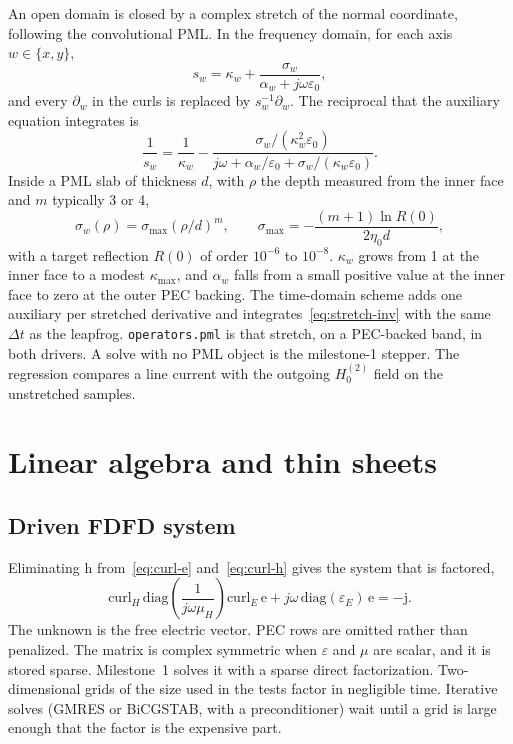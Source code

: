 \documentclass[11pt,a4paper]{article}
\numberwithin{equation}{section}
\begin{document}
An open domain is closed by a complex stretch of the normal coordinate,
following the convolutional PML. In the frequency domain, for each axis
$w\in\{x,y\}$,
\begin{equation}
s_w = \kappa_w + \frac{\sigma_w}{\alpha_w + j\omega\varepsilon_0},
\label{eq:stretch}
\end{equation}
and every $\partial_w$ in the curls is replaced by $s_w^{-1}\partial_w$. The
reciprocal that the auxiliary equation integrates is
\begin{equation}
\frac{1}{s_w}
=
\frac{1}{\kappa_w}
-
\frac{\sigma_w/(\kappa_w^2\varepsilon_0)}
{j\omega + \alpha_w/\varepsilon_0 + \sigma_w/(\kappa_w\varepsilon_0)}.
\label{eq:stretch-inv}
\end{equation}
Inside a PML slab of thickness $d$, with $\rho$ the depth measured from the
inner face and $m$ typically 3 or 4,
\begin{equation}
\sigma_w(\rho) = \sigma_{\max}(\rho/d)^m,
\qquad
\sigma_{\max} = -\frac{(m+1)\ln R(0)}{2\eta_0 d},
\label{eq:sigma-max}
\end{equation}
with a target reflection $R(0)$ of order $10^{-6}$ to $10^{-8}$. $\kappa_w$
grows from 1 at the inner face to a modest $\kappa_{\max}$, and $\alpha_w$
falls from a small positive value at the inner face to zero at the outer PEC
backing. The time-domain scheme adds one auxiliary per stretched derivative
and integrates~\eqref{eq:stretch-inv} with the same $\Delta t$ as the
leapfrog. \texttt{operators.pml} is that stretch, on a PEC-backed band, in
both drivers. A solve with no PML object is the milestone-1 stepper. The
regression compares a line current with the outgoing $H_0^{(2)}$ field on
the unstretched samples.

\section{Linear algebra and thin sheets}
\label{sec:algebra}

\subsection{Driven FDFD system}
\label{sec:fdfd}

Eliminating $\mathrm{h}$ from~\eqref{eq:curl-e} and~\eqref{eq:curl-h} gives
the system that is factored,
\begin{equation}
\mathrm{curl}_H\,\mathrm{diag}\!\left(\frac{1}{j\omega\mu_H}\right)\mathrm{curl}_E\,\mathrm{e}
+ j\omega\,\mathrm{diag}(\varepsilon_E)\,\mathrm{e}
= -\mathrm{j}.
\label{eq:fdfd}
\end{equation}
The unknown is the free electric vector. PEC rows are omitted rather than
penalized. The matrix is complex symmetric when $\varepsilon$ and $\mu$ are
scalar, and it is stored sparse. Milestone~1 solves it with a sparse direct
factorization. Two-dimensional grids of the size used in the tests factor in
negligible time. Iterative solves (GMRES or BiCGSTAB, with a preconditioner)
wait until a grid is large enough that the factor is the expensive part.
\end{document}
